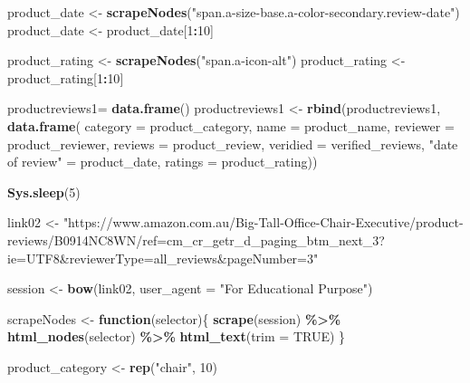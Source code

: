 \documentclass[
]{article}
\newenvironment{Shaded}{\begin{snugshade}}{\end{snugshade}}
\newcommand{\AttributeTok}[1]{\textcolor[rgb]{0.13,0.29,0.53}{#1}}
\newcommand{\ConstantTok}[1]{\textcolor[rgb]{0.56,0.35,0.01}{#1}}
\newcommand{\ControlFlowTok}[1]{\textcolor[rgb]{0.13,0.29,0.53}{\textbf{#1}}}
\newcommand{\DecValTok}[1]{\textcolor[rgb]{0.00,0.00,0.81}{#1}}
\newcommand{\FunctionTok}[1]{\textcolor[rgb]{0.13,0.29,0.53}{\textbf{#1}}}
\newcommand{\NormalTok}[1]{#1}
\newcommand{\OtherTok}[1]{\textcolor[rgb]{0.56,0.35,0.01}{#1}}
\newcommand{\SpecialCharTok}[1]{\textcolor[rgb]{0.81,0.36,0.00}{\textbf{#1}}}
\newcommand{\StringTok}[1]{\textcolor[rgb]{0.31,0.60,0.02}{#1}}
\begin{document}
\begin{Shaded}
\begin{Highlighting}[]
\NormalTok{  product\_date }\OtherTok{\textless{}{-}} \FunctionTok{scrapeNodes}\NormalTok{(}\StringTok{"span.a{-}size{-}base.a{-}color{-}secondary.review{-}date"}\NormalTok{)}
\NormalTok{  product\_date }\OtherTok{\textless{}{-}}\NormalTok{ product\_date[}\DecValTok{1}\SpecialCharTok{:}\DecValTok{10}\NormalTok{]}
  
\NormalTok{  product\_rating }\OtherTok{\textless{}{-}} \FunctionTok{scrapeNodes}\NormalTok{(}\StringTok{"span.a{-}icon{-}alt"}\NormalTok{)}
\NormalTok{  product\_rating }\OtherTok{\textless{}{-}}\NormalTok{ product\_rating[}\DecValTok{1}\SpecialCharTok{:}\DecValTok{10}\NormalTok{]}
  
\NormalTok{  productreviews1}\OtherTok{=} \FunctionTok{data.frame}\NormalTok{()}
\NormalTok{  productreviews1 }\OtherTok{\textless{}{-}} \FunctionTok{rbind}\NormalTok{(productreviews1, }\FunctionTok{data.frame}\NormalTok{(}
                      \AttributeTok{category =}\NormalTok{ product\_category,}
                      \AttributeTok{name =}\NormalTok{ product\_name,}
                      \AttributeTok{reviewer =}\NormalTok{ product\_reviewer,}
                      \AttributeTok{reviews =}\NormalTok{ product\_review,}
                      \AttributeTok{veridied =}\NormalTok{ verified\_reviews,}
                      \StringTok{"date of review"} \OtherTok{=}\NormalTok{ product\_date,}
                      \AttributeTok{ratings =}\NormalTok{ product\_rating))}

   \FunctionTok{Sys.sleep}\NormalTok{(}\DecValTok{5}\NormalTok{)}

\NormalTok{link02 }\OtherTok{\textless{}{-}} \StringTok{"https://www.amazon.com.au/Big{-}Tall{-}Office{-}Chair{-}Executive/product{-}reviews/B0914NC8WN/ref=cm\_cr\_getr\_d\_paging\_btm\_next\_3?ie=UTF8\&reviewerType=all\_reviews\&pageNumber=3"}


\NormalTok{  session }\OtherTok{\textless{}{-}} \FunctionTok{bow}\NormalTok{(link02,}
               \AttributeTok{user\_agent =} \StringTok{"For Educational Purpose"}\NormalTok{)}

\NormalTok{  scrapeNodes }\OtherTok{\textless{}{-}} \ControlFlowTok{function}\NormalTok{(selector)\{}
    \FunctionTok{scrape}\NormalTok{(session) }\SpecialCharTok{\%\textgreater{}\%}
      \FunctionTok{html\_nodes}\NormalTok{(selector) }\SpecialCharTok{\%\textgreater{}\%}
      \FunctionTok{html\_text}\NormalTok{(}\AttributeTok{trim =} \ConstantTok{TRUE}\NormalTok{)}
\NormalTok{  \}}

\NormalTok{  product\_category }\OtherTok{\textless{}{-}} \FunctionTok{rep}\NormalTok{(}\StringTok{"chair"}\NormalTok{, }\DecValTok{10}\NormalTok{)}


\end{Highlighting}
\end{Shaded}
\end{document}
